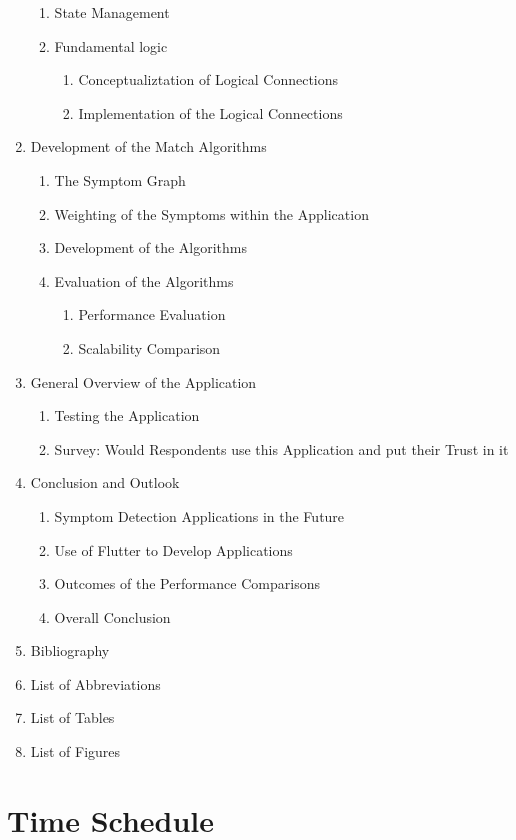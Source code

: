 \begin{enumerate}
\begin{enumerate}
	\item State Management
	\item Fundamental logic
		\begin{enumerate}
		\item Conceptualiztation of Logical Connections
		\item Implementation of the Logical Connections
		\end{enumerate}
	\end{enumerate}
	\item Development of the Match Algorithms
	\begin{enumerate}
		\item The Symptom Graph
		\item Weighting of the Symptoms within the Application
		\item Development of the Algorithms
		\item Evaluation of the Algorithms
		\begin{enumerate}
			\item Performance Evaluation
			\item Scalability Comparison
		\end{enumerate}
	\end{enumerate}
	\item General Overview of the Application
	\begin{enumerate}
		\item Testing the Application
		\item Survey: Would Respondents use this Application and put their Trust in it
	\end{enumerate}
	\item Conclusion and Outlook
		\begin{enumerate}
		\item Symptom Detection Applications in the Future
		\item Use of Flutter to Develop Applications
		\item Outcomes of the Performance Comparisons
		\item Overall Conclusion
	\end{enumerate}
	\item Bibliography
	\item List of Abbreviations
	\item List of Tables
	\item List of Figures

\end{enumerate}
\section{Time Schedule}

